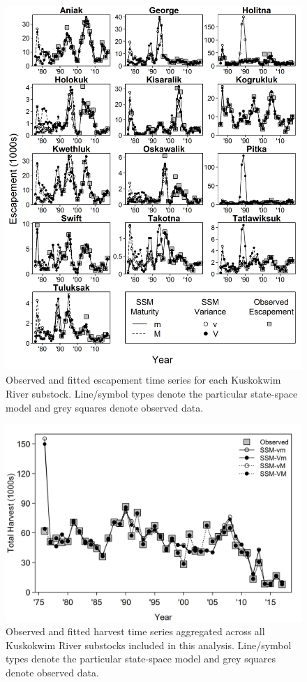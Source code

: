 \documentclass[12pt,]{book}
\theoremstyle{definition}
\theoremstyle{definition}
\theoremstyle{definition}
\theoremstyle{remark}
\begin{document}
\begin{figure}
  \centering
  \includegraphics{img/Ch4/S-fit.jpg}
  \caption{Observed and fitted escapement time series for each Kuskokwim River substock. Line/symbol types denote the particular state-space model and grey squares denote observed data.}
  \label{fig:S-fit}
\end{figure}

\clearpage

\begin{figure}
  \centering
  \includegraphics{img/Ch4/H-fit.jpg}
  \caption{Observed and fitted harvest time series aggregated across all Kuskokwim River substocks included in this analysis. Line/symbol types denote the particular state-space model and grey squares denote observed data.}
  \label{fig:H-fit}
\end{figure}
\end{document}
